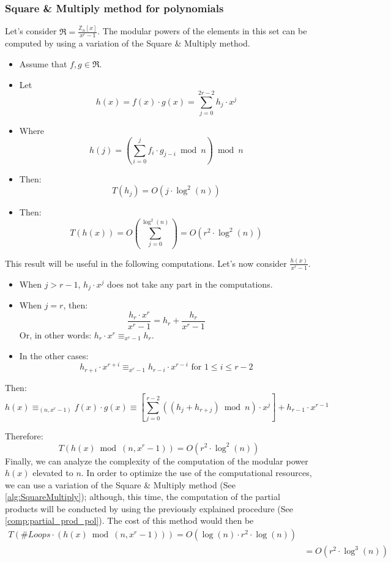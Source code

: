 \subsubsection{Square \& Multiply method for polynomials}
Let's consider $\Re = \frac{\mathbb{Z}_{n}[x]}{x^{r} - 1}$. The modular powers of the elements in this set can be computed by using a variation of the Square \& Multiply method.
\begin{itemize}
    \item Assume that $f, g \in \Re$.
    \item Let \[h(x) = f(x) \cdot g(x) = \sum_{j = 0}^{2r - 2} h_{j} \cdot x^{j}\]
    \item Where \[h(j) = (\sum_{i=0}^{j} f_{i} \cdot g_{j - i} \bmod n) \bmod n\]
    \item Then: \[T(h_{j}) = O(j \cdot \operatorname{log}^{2}(n))\]
    \item Then: \[T(h(x)) = O(\sum_{j = 0}^{\operatorname{log}^{2}(n)}) = O(r^{2} \cdot \operatorname{log}^{2}(n))\]
\end{itemize}
This result will be useful in the following computations. \newline
Let's now consider $\frac{h(x)}{x^{r} - 1}$.
\begin{itemize}
    \item When $j > r - 1$, $h_{j} \cdot x^{j}$ does not take any part in the computations.
    \item When $j = r$, then: \[\frac{h_{r} \cdot x^{r}}{x^{r} - 1 } = h_{r} + \frac{h_{r}}{x^{r} - 1}\]
    Or, in other words: $h_{r} \cdot x^{r} \equiv_{x^{r} - 1} h_{r}$.
    \item In the other cases: \[h_{r+i} \cdot x^{r+i} \equiv_{x^{r} - 1} h_{r-i} \cdot x^{r-i} \text{ for } 1 \leq i \leq r - 2\]
\end{itemize}
Then:
\[h(x) \equiv_{(n, x^{r} - 1)} f(x) \cdot g(x) \equiv
[\sum_{j=0}^{r - 2}((h_{j} + h_{r + j}) \bmod n) \cdot x^{j}] + h_{r-1} \cdot x^{r-1}\]\label{comp:partial_prod_pol}

Therefore: \[T(h(x) \bmod (n, x^{r} - 1)) = O(r^{2} \cdot \operatorname{log}^{2}(n))\]
Finally, we can analyze the complexity of the computation of the modular power $h(x)$ elevated to $n$. \newline
In order to optimize the use of the computational resources, we can use a variation of the Square \& Multiply method (See \ref{alg:SquareMultiply});
although, this time, the computation of the partial products will be conducted by using the previously explained procedure (See \ref{comp:partial_prod_pol}). \newline
The cost of this method would then be
\begin{align*}
    T(\#Loops \cdot (h(x) \bmod (n, x^{r} - 1))) = O(\operatorname{log}(n) \cdot r^{2} \cdot \operatorname{log}(n)) \\
    & = O(r^{2} \cdot \operatorname{log}^{3}(n))
\end{align*}



